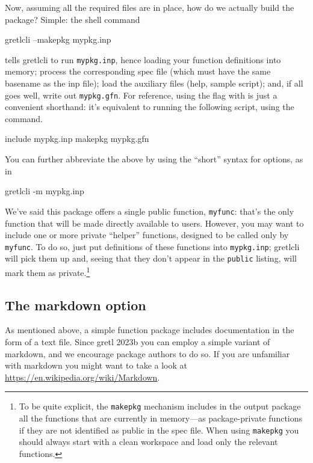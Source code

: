 \documentclass[oneside]{book}
\begin{document}
Now, assuming all the required files are in place, how do we actually
build the package? Simple: the shell command
%
\begin{code}
gretlcli --makepkg mypkg.inp
\end{code}
%
tells \textsf{gretlcli} to run \texttt{mypkg.inp}, hence loading your
function definitions into memory; process the corresponding
\textsf{spec} file (which must have the same basename as the
\textsf{inp} file); load the auxiliary files (help, sample script);
and, if all goes well, write out \texttt{mypkg.gfn}. For reference,
using the  flag with  is just a
convenient shorthand: it's equivalent to running the following script,
using the  command.
%
\begin{code}
include mypkg.inp
makepkg mypkg.gfn
\end{code}
You can further abbreviate the above by using the ``short'' syntax for
options, as in
\begin{code}
gretlcli -m mypkg.inp
\end{code}

We've said this package offers a single public function,
\texttt{myfunc}: that's the only function that will be made directly
available to users. However, you may want to include one or more
private ``helper'' functions, designed to be called only by
\texttt{myfunc}. To do so, just put definitions of these functions
into \texttt{mypkg.inp}; \textsf{gretlcli} will pick them up and,
seeing that they don't appear in the \texttt{public} listing, will
mark them as private.\footnote{To be quite explicit, the
  \texttt{makepkg} mechanism includes in the output package all the
  functions that are currently in memory---as package-private
  functions if they are not identified as public in the \textsf{spec}
  file. When using \texttt{makepkg} you should always start with a
  clean workspace and load only the relevant functions.}

\subsection{The markdown option}
\label{sec:md}

As mentioned above, a simple function package includes documentation
in the form of a text file. Since gretl 2023b you can employ a simple
variant of markdown, and we encourage package authors to do so. If you
are unfamiliar with markdown you might want to take a look at
\url{https://en.wikipedia.org/wiki/Markdown}.
\end{document}
